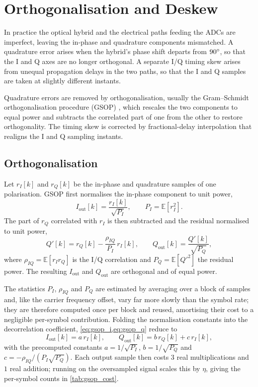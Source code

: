 \documentclass[12pt,a4paper]{report}
\begin{document}
\section{Orthogonalisation and Deskew}
In practice the optical hybrid and the electrical paths feeding the ADCs are imperfect, leaving the in-phase and quadrature components mismatched. A quadrature error arises when the hybrid's phase shift departs from $90\degree$, so that the I and Q axes are no longer orthogonal. A separate I/Q timing skew arises from unequal propagation delays in the two paths, so that the I and Q samples are taken at slightly different instants.

Quadrature errors are removed by orthogonalisation, usually the Gram--Schmidt orthogonalisation procedure (GSOP) \cite{Mello;21,coherent_receivers}, which rescales the two components to equal power and subtracts the correlated part of one from the other to restore orthogonality. The timing skew is corrected by fractional-delay interpolation that realigns the I and Q sampling instants.

\subsection{Orthogonalisation}
Let $r_I[k]$ and $r_Q[k]$ be the in-phase and quadrature samples of one polarisation. GSOP first normalises the in-phase component to unit power,
\begin{equation}
    I_\mathrm{out}[k] = \frac{r_I[k]}{\sqrt{P_I}}, \qquad P_I = \mathbb{E}\!\left[r_I^2\right].
    \label{eq:gsop_i}
\end{equation}
The part of $r_Q$ correlated with $r_I$ is then subtracted and the residual normalised to unit power,
\begin{equation}
    Q'[k] = r_Q[k] - \frac{\rho_{IQ}}{P_I}\,r_I[k], \qquad
    Q_\mathrm{out}[k] = \frac{Q'[k]}{\sqrt{P_Q}},
    \label{eq:gsop_q}
\end{equation}
where $\rho_{IQ} = \mathbb{E}\!\left[r_I r_Q\right]$ is the I/Q correlation and $P_Q = \mathbb{E}\!\left[Q'^2\right]$ the residual power. The resulting $I_\mathrm{out}$ and $Q_\mathrm{out}$ are orthogonal and of equal power.

The statistics $P_I$, $\rho_{IQ}$ and $P_Q$ are estimated by averaging over a block of samples and, like the carrier frequency offset, vary far more slowly than the symbol rate; they are therefore computed once per block and reused, amortising their cost to a negligible per-symbol contribution. Folding the normalisation constants into the decorrelation coefficient, \cref{eq:gsop_i,eq:gsop_q} reduce to
\begin{equation}
    I_\mathrm{out}[k] = a\,r_I[k], \qquad Q_\mathrm{out}[k] = b\,r_Q[k] + c\,r_I[k],
\end{equation}
with the precomputed constants $a = 1/\sqrt{P_I}$, $b = 1/\sqrt{P_Q}$ and $c = -\rho_{IQ}/(P_I\sqrt{P_Q})$. Each output sample then costs $3$ real multiplications and $1$ real addition; running on the oversampled signal scales this by $\eta$, giving the per-symbol counts in \cref{tab:gsop_cost}.
\end{document}
